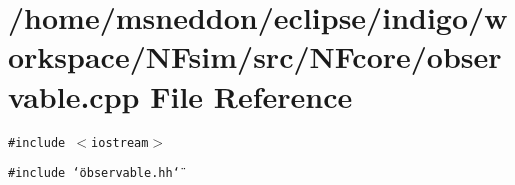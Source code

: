 \section{/home/msneddon/eclipse/indigo/workspace/NFsim/src/NFcore/observable.cpp File Reference}
\label{observable_8cpp}


{\tt \#include $<$iostream$>$}\par
{\tt \#include \char`\"{}observable.hh\char`\"{}}\par
